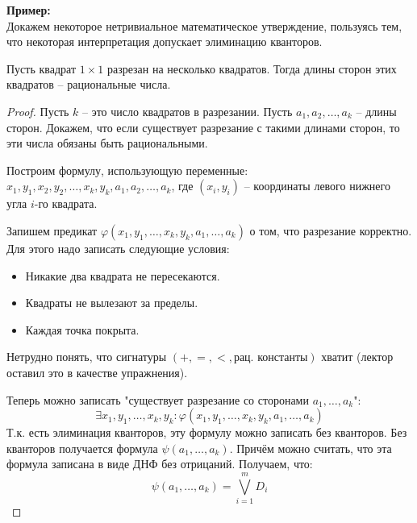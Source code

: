 \textbf{Пример:} \\
Докажем некоторое нетривиальное математическое утверждение, пользуясь тем, что некоторая интерпретация допускает элиминацию кванторов.
\begin{theorem}
    Пусть квадрат $1\times1$ разрезан на несколько квадратов. Тогда длины сторон этих квадратов -- рациональные числа.
\end{theorem}
\begin{proof}
    Пусть $k$ -- это число квадратов в разрезании. Пусть $a_1, a_2, \dots, a_k$ -- длины сторон. Докажем, что если существует разрезание с такими длинами сторон, то эти числа обязаны быть рациональными.

    Построим формулу, использующую переменные: $x_1, y_1, x_2, y_2, \dots, x_k, y_k, a_1, a_2, \dots, a_k$, где $(x_i, y_i)$ -- координаты левого нижнего угла $i$-го квадрата.

    Запишем предикат $\varphi(x_1, y_1, \dots, x_k, y_k, a_1, \dots, a_k)$ о том, что разрезание корректно. Для этого надо записать следующие условия:
    \begin{itemize}
        \item Никакие два квадрата не пересекаются.
        \item Квадраты не вылезают за пределы.
        \item Каждая точка покрыта.
    \end{itemize}
    Нетрудно понять, что сигнатуры $(+, =, <, \text{рац. константы})$ хватит (лектор оставил это в качестве упражнения).
    
    Теперь можно записать "существует разрезание со сторонами $a_1, \dots, a_k$":
    $$ \exists x_1, y_1, \dots, x_k, y_k : \varphi(x_1, y_1, \dots, x_k, y_k, a_1, \dots, a_k) $$
    Т.к. есть элиминация кванторов, эту формулу можно записать без кванторов. Без кванторов получается формула $\psi(a_1, \dots, a_k)$. Причём можно считать, что эта формула записана в виде ДНФ без отрицаний. Получаем, что:
    $$\psi(a_1, \dots, a_k) = \bigvee_{i=1}^m D_i$$


\end{proof}
